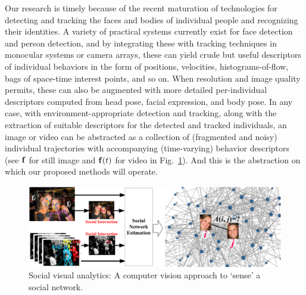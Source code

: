 Our research is timely because of the recent maturation of technologies for detecting and tracking the faces and bodies of individual people and recognizing their identities. A variety of practical systems currently exist for face detection and person detection, and by integrating these with tracking techniques in monocular systems or camera arrays, these can yield crude but useful descriptors of individual behaviors in the form of positions, velocities, histograms-of-flow, bags of space-time interest points, and so on. When resolution and image quality permits, these can also be augmented with more detailed per-individual descriptors computed from head pose, facial expression, and body pose. In any case, with environment-appropriate detection and tracking, along with the extraction of suitable descriptors for the detected and tracked individuals, an image or video can be abstracted as a collection of (fragmented and noisy) individual trajectories with accompanying (time-varying) behavior descriptors (see ${\bf f}$ for still image and ${\bf f}(t)$ for video in Fig.~\ref{fig:intro}). And this is the abstraction on which our proposed methods will operate.

\begin{figure}[t!]
\begin{center}
\includegraphics[width=\columnwidth]{intro_1}
\end{center}
\vspace{-0.25in} \caption{\captionsize 
Social visual analytics: A computer vision approach to `sense' a social network. \label{fig:intro}\afterfigspace}
\end{figure}

